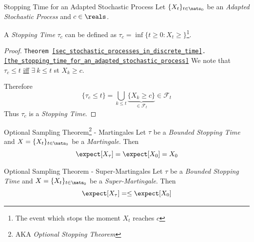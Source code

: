 \documentclass[11pt,a4paper]{article}
\begin{document}
    \begin{theorem}{Stopping Time for an Adapted Stochastic Process}\label{the_stopping_time_for_an_adapted_stochastic_process}
      Let $\{X_t\}_{t\in\nats_0}$ be an \textit{Adapted Stochastic Process} and $c\in\reals$.
      \par A \textit{Stopping Time} $\tau_c$ can be defined as $\tau_c=\inf\{t\geq0:X_t\geq \}$\footnote{The event which stops the moment $X_t$ reaches $c$}.
    \end{theorem}

    \begin{proof}{\texttt{Theorem \ref{sec_stochastic_processes_in_discrete_time}.\ref{the_stopping_time_for_an_adapted_stochastic_process}}}
      We note that $\tau_c\leq t$ \underline{iff} $\exists\ k\leq t$ st $X_k\geq c$.
      \par Therefore
      \[ \{\tau_c\leq t\}=\bigcup\limits_{k\leq t}\underbrace{\{X_k\geq c\}}_{\in\mathcal{F}_t}\in\mathcal{F}_t \]
      Thus $\tau_c$ is a \textit{Stopping Time}.
    \end{proof}

    \begin{theorem}{Optional Sampling Theorem\footnote{AKA \textit{Optional Stopping Theorem}} - Martingales}\label{the_optional_sampling_theorem}
      Let $\tau$ be a \textit{Bounded Stopping Time} and $X=\{X_t\}_{t\in\nats_0}$ be a \textit{Martingale}. Then
      \[ \expect[X_\tau]=\expect[X_0]=X_0 \]
    \end{theorem}

    \begin{theorem}{Optional Sampling Theorem - Super-Martingales}\label{the_optional_sampling_theorem_supermartingales}
      Let $\tau$ be a \textit{Bounded Stopping Time} and $X=\{X_t\}_{t\in\nats_0}$ be a \textit{Super-Martingale}. Then
      \[ \expect[X_\tau]=\leq \expect[X_0] \]
    \end{theorem}
\end{document}
